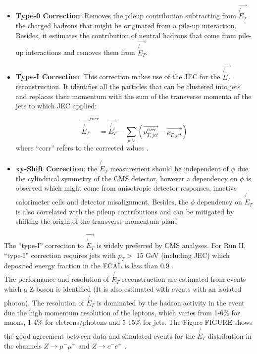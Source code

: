 \begin{itemize}
 \item \textbf{Type-0 Correction}: Removes the pileup contribution subtracting
 from $\vec{\not{E}_{T}}$ the charged hadrons that might be originated 
 from a pile-up interaction. Besides, it estimates the contribution of neutral 
 hadrons that come from pile-up interactions and removes them from $\vec{\not{E}_{T}}$.

  \item \textbf{Type-I Correction}: This correction makes use of the JEC 
 for the $\vec{\not{E}_{T}}$ reconstruction. It identifies all the particles that can be 
 clustered into jets and replaces their momentum with the sum of the transverse momenta of the 
 jets to which JEC applied:

\begin{equation}
  \label{eq:METcorrection}
  \vec{\not{E_{T}}}^{corr}= \vec{\not{E_{T}}} - \sum_{jets}(\vec{p_{T,jet}^{corr}}-\vec{p_{T,jet}})
\end{equation} 
where ``corr'' refers to the corrected values \cite{CMS-PAS-JME-16-004}. 
 
 \item \textbf{xy-Shift Correction}: the $\not{E}_{T}$ measurement should be independent of $\phi$
 due the cylindrical symmetry of the CMS detector, however a dependency on $\phi$ is observed which 
 might come from anisotropic detector responses, inactive calorimeter cells and detector 
 misalignment. Besides, the $\phi$ dependency on $\not{E}_{T}$ is also correlated with the pileup
 contributions and can be mitigated by shifting the origin of the transverse momentum plane
\end{itemize}

The ``type-I'' correction to $\vec{\not{E}_{T}}$ is widely preferred by CMS analyses. For Run II, 
``type-I'' correction requires jets with $p_{T} >$ 15 GeV (including JEC) which deposited 
energy fraction in the ECAL is less than 0.9 \cite{CMS-PAS-JME-16-004}. \\

The performance and resolution of $\not{E_{T}}$ reconstruction are estimated 
from events which a Z boson is identified (It is also estimated with events 
with an isolated photon). The resolution of $\not{E_{T}}$ is dominated 
by the hadron activity in the event due the high momentum resolution of the leptons, which varies 
from 1-6$\%$ for muons, 1-4$\%$ for eletrons$/$photons and 5-15$\%$ for jets. The Figure FIGURE shows the 
good agreement between data and simulated events for the $\not{E_{T}}$ distribution in the 
 channels $Z\rightarrow \mu^{-}\mu^{+}$ and $Z\rightarrow e^{-}e^{+}$ \cite{CMS-PAS-JME-16-004}.
 
